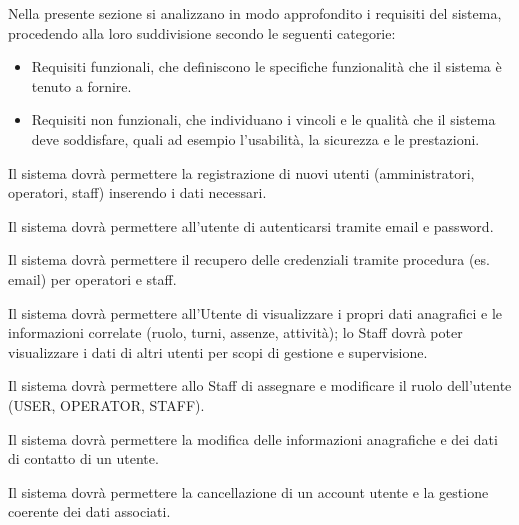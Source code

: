 \documentclass[a4paper]{report}
\begin{document}

Nella presente sezione si analizzano in modo approfondito i requisiti del sistema, procedendo alla loro suddivisione secondo le seguenti categorie:
\begin{itemize}
    \item Requisiti funzionali, che definiscono le specifiche funzionalità che il sistema è tenuto a fornire.
    \item Requisiti non funzionali, che individuano i vincoli e le qualità che il sistema deve soddisfare, quali ad esempio l'usabilità, la sicurezza e le prestazioni.
\end{itemize}




Il sistema dovrà permettere la registrazione di nuovi utenti (amministratori, operatori, staff) inserendo i dati necessari.


Il sistema dovrà permettere all’utente di autenticarsi tramite email e password.


Il sistema dovrà permettere il recupero delle credenziali tramite procedura (es. email) per operatori e staff.


Il sistema dovrà permettere all'Utente di visualizzare i propri dati anagrafici e le informazioni correlate (ruolo, turni, assenze, attività); lo Staff dovrà poter visualizzare i dati di altri utenti per scopi di gestione e supervisione.


Il sistema dovrà permettere allo Staff di assegnare e modificare il ruolo dell'utente (USER, OPERATOR, STAFF).


Il sistema dovrà permettere la modifica delle informazioni anagrafiche e dei dati di contatto di un utente.


Il sistema dovrà permettere la cancellazione di un account utente e la gestione coerente dei dati associati.
\end{document}
